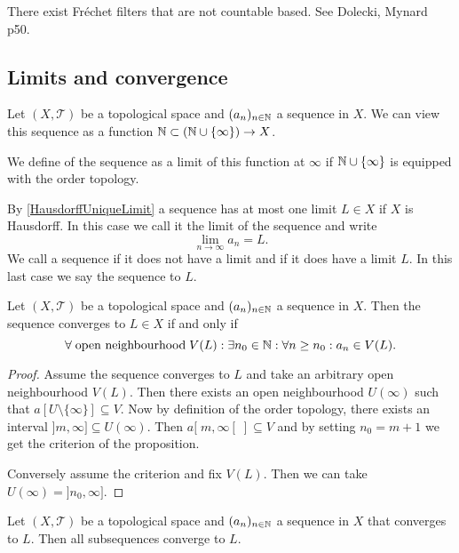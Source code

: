 \begin{example}
There exist Fréchet filters that are not countable based. See Dolecki, Mynard p50.
\end{example}


\subsection{Limits and convergence}
\begin{definition}
Let $(X,\mathcal{T})$ be a topological space and $(a_n)_{n\in\mathbb{N}}$ a sequence in $X$. We can view this sequence as a function $\mathbb{N}\subset (\mathbb{N}\cup\{\infty\})\to X$.

We define  of the sequence as a limit of this function at $\infty$ if $\mathbb{N}\cup\{\infty\}$ is equipped with the order topology.
\end{definition}
By \ref{HausdorffUniqueLimit} a sequence has at most one limit $L\in X$ if $X$ is Hausdorff. In this case we call it the limit of the sequence and write
\[ \lim_{n\to \infty}a_n = L. \]
We call a sequence  if it does not have a limit and
  if it does have a limit $L$. In this last case we say the sequence  to $L$.

\begin{proposition} \label{sequenceConvergence}
Let $(X,\mathcal{T})$ be a topological space and $(a_n)_{n\in\mathbb{N}}$ a sequence in $X$. Then the sequence converges to $L\in X$ \textup{if and only if}
\[ \forall \;\text{open neighbourhood}\; V(L): \exists n_0\in \mathbb{N}: \forall n\geq n_0: a_n\in V(L). \]
\end{proposition}
\begin{proof}
Assume the sequence converges to $L$ and take an arbitrary open neighbourhood $V(L)$. Then there exists an open neighbourhood $U(\infty)$ such that $a[U\setminus\{\infty\}] \subseteq V$. Now by definition of the order topology, there exists an interval $]m, \infty]\subseteq U(\infty)$. Then $a[\;m, \infty[\;] \subseteq V$ and by setting $n_0=m+1$ we get the criterion of the proposition.

Conversely assume the criterion and fix $V(L)$. Then we can take $U(\infty)=]n_0, \infty]$.
\end{proof}

\begin{lemma} \label{subsequencesConverge}
Let $(X,\mathcal{T})$ be a topological space and $(a_n)_{n\in\mathbb{N}}$ a sequence in $X$ that converges to $L$. Then all subsequences converge to $L$.
\end{lemma}

